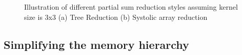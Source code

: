 \begin{figure}
    \centering
    \caption{Illustration of different partial sum reduction styles assuming kernel size is 3x3 (a) Tree Reduction (b) Systolic array reduction}
    \label{fig:reduction_styles}
\end{figure}

\subsection{Simplifying the memory hierarchy}
\label{chap:hw_dse:simplifying_hierarchy}

